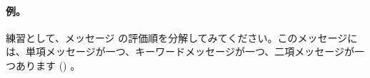 \documentclass[a4paper,10pt,twoside]{book}
\begin{document}




\paragraph{例。} 練習として、メッセージ  の評価順を分解してみてください。このメッセージには、単項メッセージが一つ、キーワードメッセージが一つ、二項メッセージが一つあります () 。

\end{document}

